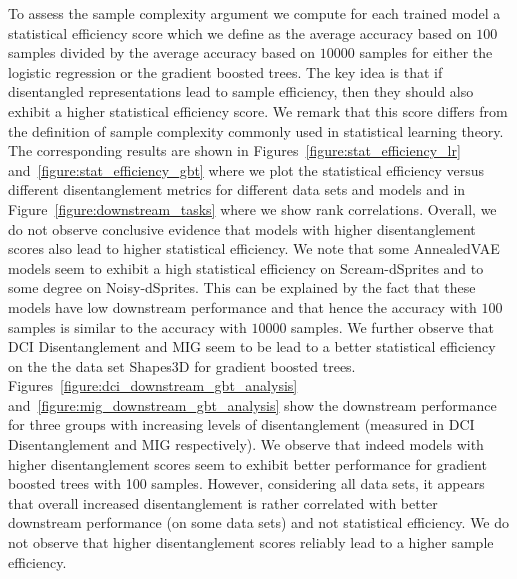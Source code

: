 To assess the sample complexity argument we compute for each trained model a statistical efficiency score which we define as the average accuracy based on $\num{100}$ samples divided by the average accuracy based on $\num{10000}$ samples for either the logistic regression or the gradient boosted trees.
The key idea is that if disentangled representations lead to sample efficiency, then they should also exhibit a higher statistical efficiency score. We remark that this score differs from the definition of sample complexity commonly used in statistical learning theory.
The corresponding results are shown in Figures~\ref{figure:stat_efficiency_lr} and~\ref{figure:stat_efficiency_gbt} where we plot the statistical efficiency versus different disentanglement metrics for different data sets and models and in Figure~\ref{figure:downstream_tasks} where we show rank correlations.
Overall, we do not observe conclusive evidence that models with higher disentanglement scores also lead to higher statistical efficiency.
We note that some AnnealedVAE models seem to exhibit a high statistical efficiency on Scream-dSprites and to some degree on Noisy-dSprites.
This can be explained by the fact that these models have low downstream performance and that hence the accuracy with $\num{100}$ samples is similar to the accuracy with $\num{10000}$ samples.
We further observe that DCI Disentanglement and MIG seem to be lead to a better statistical efficiency on the the data set Shapes3D for gradient boosted trees.
Figures~\ref{figure:dci_downstream_gbt_analysis} and~\ref{figure:mig_downstream_gbt_analysis} show the downstream performance for three groups with increasing levels of disentanglement (measured in DCI Disentanglement and MIG respectively).
We observe that indeed models with higher disentanglement scores seem to exhibit better performance for gradient boosted trees with 100 samples.
However, considering all data sets, it appears that overall increased disentanglement is rather correlated with better downstream performance (on some data sets) and not statistical efficiency.
We do not observe that higher disentanglement scores reliably lead to a higher sample efficiency.

